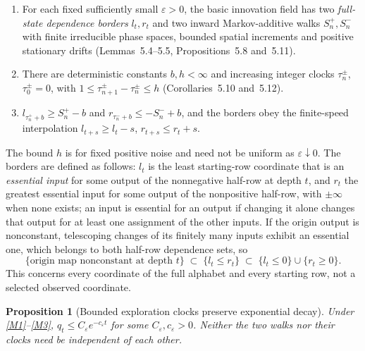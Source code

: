 \documentclass[11pt]{article}
\theoremstyle{plain}
\newtheorem{proposition}[theorem]{Proposition}
\theoremstyle{definition}
\theoremstyle{remark}
\newcommand{\eps}{\varepsilon}
\begin{document}
\begin{enumerate}[label=(M\arabic*)]
\item\label{M1} For each fixed sufficiently small $\eps>0$, the basic innovation field has two \emph{full-state dependence borders} $l_t,r_t$ and two inward Markov-additive walks $S^+_n,S^-_n$ with finite irreducible phase spaces, bounded spatial increments and positive stationary drifts (Lemmas~5.4--5.5, Propositions~5.8 and~5.11).
\item\label{M2} There are deterministic constants $b,h<\infty$ and increasing integer clocks $\tau^\pm_n$, $\tau^\pm_0=0$, with $1\le\tau^\pm_{n+1}-\tau^\pm_n\le h$ (Corollaries~5.10 and~5.12).
\item\label{M3} $l_{\tau^+_n+b}\ge S^+_n-b$ and $r_{\tau^-_n+b}\le-S^-_n+b$, and the borders obey the finite-speed interpolation $l_{t+s}\ge l_t-s$, $r_{t+s}\le r_t+s$.
\end{enumerate}
The bound $h$ is for fixed positive noise and need not be uniform as $\eps\downarrow0$. The borders are defined as follows: $l_t$ is the least starting-row coordinate that is an \emph{essential input} for some output of the nonnegative half-row at depth $t$, and $r_t$ the greatest essential input for some output of the nonpositive half-row, with $\pm\infty$ when none exists; an input is essential for an output if changing it alone changes that output for at least one assignment of the other inputs. If the origin output is nonconstant, telescoping changes of its finitely many inputs exhibit an essential one, which belongs to both half-row dependence sets, so
\begin{equation}
\{\text{origin map nonconstant at depth }t\}\;\subset\;\{l_t\le r_t\}\;\subset\;\{l_t\le0\}\cup\{r_t\ge0\}.
\label{eq:borders}
\end{equation}
This concerns every coordinate of the full alphabet and every starting row, not a selected observed coordinate.

\begin{proposition}[Bounded exploration clocks preserve exponential decay]
\label{prop:clocks}
Under \ref{M1}--\ref{M3}, $q_t\le C_\eps e^{-c_\eps t}$ for some $C_\eps,c_\eps>0$. Neither the two walks nor their clocks need be independent of each other.
\end{proposition}
\end{document}
